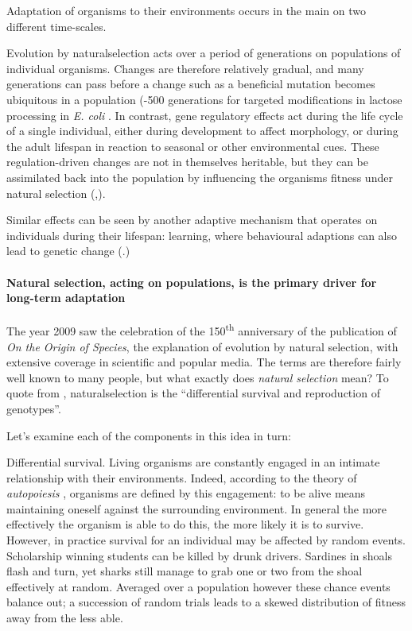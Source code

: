 Adaptation of organisms to their environments occurs in the main on two different time-scales.

Evolution by \gls{naturalselection} acts over a period of generations on populations of individual organisms. Changes are therefore relatively gradual, and many generations can pass before a change such as a beneficial mutation becomes ubiquitous in a population (-500 generations for targeted modifications in lactose processing in \emph{E. coli} \parencite{Dekel:2005fk}. In contrast, gene regulatory effects act during the life cycle of a single individual, either during development to affect morphology, or during the adult lifespan in reaction to seasonal or other environmental cues. These regulation-driven changes are not in themselves heritable, but they can be assimilated back into the population by influencing the organisms fitness under natural selection (\eg,\parencite{Baldwin:1896ly,Dennett:2003ve,Paenke:2009xe,Paenke:2007ve}).

Similar effects can be seen by another adaptive mechanism that operates on individuals during their lifespan: learning, where behavioural adaptions can also lead to genetic change (\eg \parencite{Hinton:1987vy}.)

\paragraph{Natural selection, acting on populations, is the primary driver for long-term adaptation}

The year 2009 saw the celebration of the 150\textsuperscript{th} anniversary of the publication of \emph{On the Origin of Species}, the explanation of evolution by natural selection, with extensive coverage in scientific and popular media. The terms are therefore fairly well known to many people, but what exactly does \emph{natural selection} mean? To quote from \parencite{Futuyama:1979tg}, \gls{naturalselection} is the ``differential survival and reproduction of genotypes''.

Let's examine each of the components in this idea in turn:

Differential survival. Living organisms are constantly engaged in an intimate relationship with their environments. Indeed, according to the theory of \emph{autopoiesis} \parencite{Varela:1974qd}, organisms are defined by this engagement: to be alive means maintaining oneself against the surrounding environment. In general the more effectively the organism is able to do this, the more likely it is to survive. However, in practice survival for an individual may be affected by random events. Scholarship winning students can be killed by drunk drivers. Sardines in shoals flash and turn, yet sharks still manage to grab one or two from the shoal effectively at random. Averaged over a population however these chance events balance out; a succession of random trials leads to a skewed distribution of fitness away from the less able.

